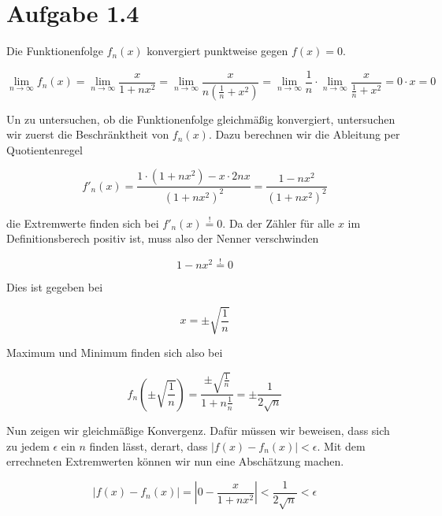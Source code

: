\documentclass[a4paper,german,12pt,smallheadings]{scrartcl}
\begin{document}
\section*{Aufgabe 1.4}

Die Funktionenfolge $f_n(x)$ konvergiert punktweise gegen $f(x) = 0$.

\begin{equation*}
  \lim_{n \to \infty} f_n(x) = \lim_{n \to \infty} \frac{x}{1+nx^2} = \lim_{n \to \infty} \frac{x}{n \left(\frac{1}{n} + x^2\right)} = \lim_{n \to \infty} \frac{1}{n} \cdot \lim_{n \to \infty} \frac{x}{\frac{1}{n} + x^2} = 0 \cdot x = 0
\end{equation*}

Un zu untersuchen, ob die Funktionenfolge gleichmäßig konvergiert, untersuchen wir zuerst die Beschränktheit von $f_n(x)$. Dazu berechnen wir die Ableitung per Quotientenregel

\begin{equation*}
  f'_n(x) = \frac{1 \cdot (1+nx^2) - x \cdot 2nx}{(1+nx^2)^2} = \frac{1-nx^2}{(1+nx^2)^2}
\end{equation*}

die Extremwerte finden sich bei $f'_n(x) \overset{!}{=} 0$. Da der Zähler für
alle $x$ im Definitionsberech positiv ist, muss also der Nenner verschwinden

\begin{equation*}
  1-nx^2 \overset{!}{=} 0
\end{equation*}

Dies ist gegeben bei

\begin{equation}
  x = \pm \sqrt{\frac{1}{n}}
\end{equation}

Maximum und Minimum finden sich also bei

\begin{equation*}
  f_n\left(\pm\sqrt{\frac{1}{n}}\right) = \frac{\pm\sqrt{\frac{1}{n}}}{1+n\frac{1}{n}} = \pm\frac{1}{2\sqrt{n}}
\end{equation*}

Nun zeigen wir gleichmäßige Konvergenz. Dafür müssen wir beweisen, dass sich zu
jedem $\epsilon$ ein $n$ finden lässt, derart, dass $\left| f(x) - f_n(x)
\right| < \epsilon$. Mit dem errechneten Extremwerten können wir nun eine
Abschätzung machen.

\begin{equation*}
  \left| f(x) - f_n(x) \right| = \left|0-\frac{x}{1+nx^2}\right| < \frac{1}{2\sqrt{n}} < \epsilon
\end{equation*}
\end{document}
